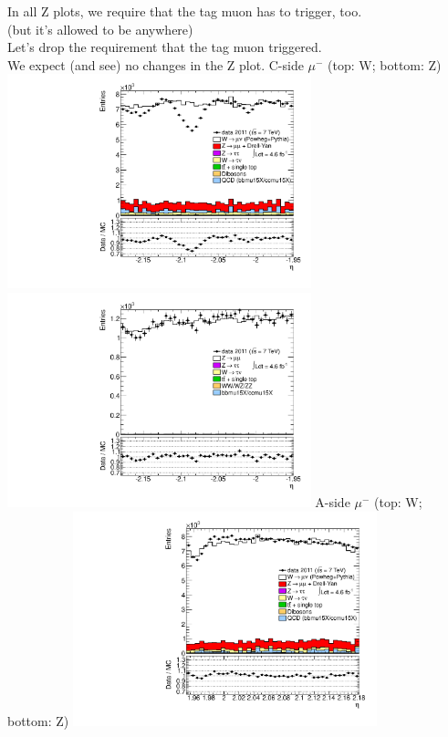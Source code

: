  {
In all Z plots, we require that the tag muon has to trigger, too. \\
(but it's allowed to be anywhere) \\
Let's drop the requirement that the tag muon triggered. \\
We expect (and see) no changes in the Z plot.
}
 {
\colb[T]
C-side $\mu^{-}$ (top: W; bottom: Z)
\centering
\includegraphics[width=0.66\textwidth]{dates/20130306/figures/etaphi/W_10_C_stack_l_eta_NEG} \\
\includegraphics[width=0.66\textwidth]{dates/20130306/figures/etaphi/Ztprobe_10_C_stack_lN_eta_ALL.pdf}
A-side $\mu^{-}$ (top: W; bottom: Z)
\centering
\includegraphics[width=0.66\textwidth]{dates/20130306/figures/etaphi/W_10_A_stack_l_eta_NEG} \\
}
